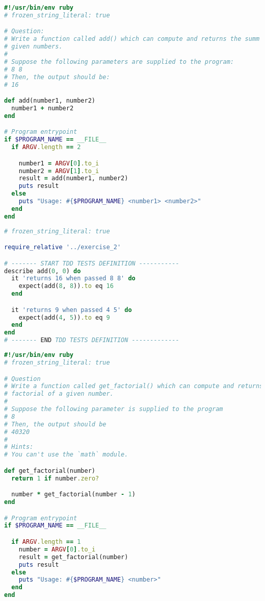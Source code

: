 \begin{lstlisting}[language=ruby,caption={exercise\_2.rb},captionpos=b]
#!/usr/bin/env ruby
# frozen_string_literal: true

# Question:
# Write a function called add() which can compute and returns the summ of two
# given numbers.
#
# Suppose the following parameters are supplied to the program:
# 8 8
# Then, the output should be:
# 16

def add(number1, number2)
  number1 + number2
end

# Program entrypoint
if $PROGRAM_NAME == __FILE__
  if ARGV.length == 2

    number1 = ARGV[0].to_i
    number2 = ARGV[1].to_i
    result = add(number1, number2)
    puts result
  else
    puts "Usage: #{$PROGRAM_NAME} <number1> <number2>"
  end
end
\end{lstlisting}

\begin{lstlisting}[language=ruby,caption={exercise\_2\_spec.rb},captionpos=b]
# frozen_string_literal: true

require_relative '../exercise_2'

# ------- START TDD TESTS DEFINITION -----------
describe add(0, 0) do
  it 'returns 16 when passed 8 8' do
    expect(add(8, 8)).to eq 16
  end

  it 'returns 9 when passed 4 5' do
    expect(add(4, 5)).to eq 9
  end
end
# ------- END TDD TESTS DEFINITION -------------
\end{lstlisting}

\begin{lstlisting}[language=ruby,caption={exercise\_3.rb},captionpos=b]
#!/usr/bin/env ruby
# frozen_string_literal: true

# Question
# Write a function called get_factorial() which can compute and returns the
# factorial of a given number.
#
# Suppose the following parameter is supplied to the program
# 8
# Then, the output should be
# 40320
#
# Hints:
# You can't use the `math` module.

def get_factorial(number)
  return 1 if number.zero?

  number * get_factorial(number - 1)
end

# Program entrypoint
if $PROGRAM_NAME == __FILE__

  if ARGV.length == 1
    number = ARGV[0].to_i
    result = get_factorial(number)
    puts result
  else
    puts "Usage: #{$PROGRAM_NAME} <number>"
  end
end
\end{lstlisting}

